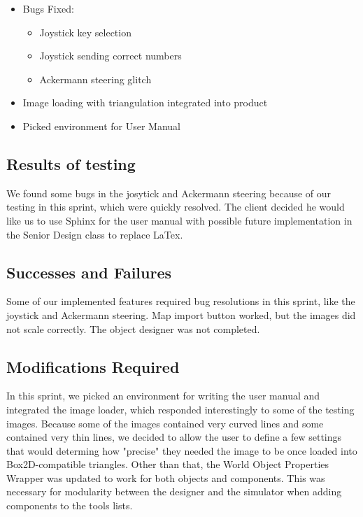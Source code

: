 \begin{itemize}
	\item Bugs Fixed:	
	\begin{itemize}
		\item Joystick key selection
		\item Joystick sending correct numbers
		\item Ackermann steering glitch
	\end{itemize}
	\item Image loading with triangulation integrated into product
	\item Picked environment for User Manual
\end{itemize}

\subsection{Results of testing}
We found some bugs in the josytick and Ackermann steering because of our testing in this sprint, which were quickly resolved. The client decided he would like us to use Sphinx for the user manual with possible future implementation in the Senior Design class to replace LaTex.

\subsection{Successes and Failures}
Some of our implemented features required bug resolutions in this sprint, like the joystick and Ackermann steering. Map import button worked, but the images did not scale correctly. The object designer was not completed.

\subsection{Modifications Required}

In this sprint, we picked an environment for writing the user manual and integrated the image loader, which responded interestingly to some of the testing images. Because some of the images contained very curved lines and some contained very thin lines, we decided to allow the user to define a few settings that would determing how "precise" they needed the image to be once loaded into Box2D-compatible triangles. Other than that, the World Object Properties Wrapper was updated to work for both objects and components. This was necessary for modularity between the designer and the simulator when adding components to the tools lists.

